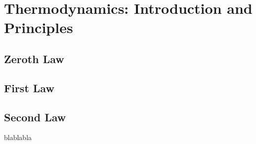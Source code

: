
\chapter{Thermodynamics: Introduction and Principles}


\section{Zeroth Law}\label{zeroth_law}



\section{First Law}\label{first_law}


\section{Second Law}\label{second_law}





blablabla \citep{batchelor_1967}
